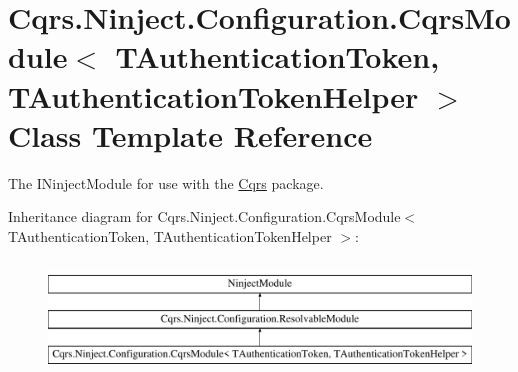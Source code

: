 \hypertarget{classCqrs_1_1Ninject_1_1Configuration_1_1CqrsModule}{}\section{Cqrs.\+Ninject.\+Configuration.\+Cqrs\+Module$<$ T\+Authentication\+Token, T\+Authentication\+Token\+Helper $>$ Class Template Reference}
\label{classCqrs_1_1Ninject_1_1Configuration_1_1CqrsModule}


The I\+Ninject\+Module for use with the \hyperlink{namespaceCqrs}{Cqrs} package.  


Inheritance diagram for Cqrs.\+Ninject.\+Configuration.\+Cqrs\+Module$<$ T\+Authentication\+Token, T\+Authentication\+Token\+Helper $>$\+:\begin{figure}[H]
\begin{center}
\leavevmode
\includegraphics[height=3.000000cm]{classCqrs_1_1Ninject_1_1Configuration_1_1CqrsModule}
\end{center}
\end{figure}

